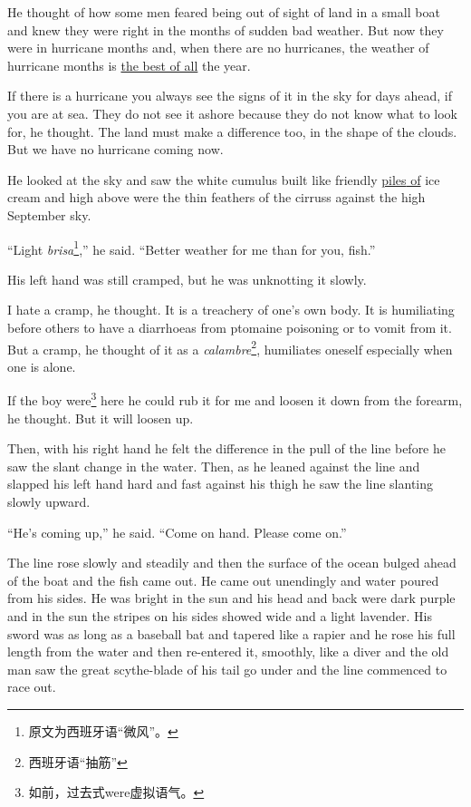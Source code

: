 \documentclass[fontset=ubuntu]{ctexrep}
\begin{document}
He thought of how some men \gls{feared} being out of sight of land in a
small boat and knew they were right in the months of sudden bad weather. But
now they were in \gls{hurricane} months and, when there are no hurricanes, the
weather of hurricane months is \uline{the best of all} the year.

If there is a hurricane you always see the signs of it in the sky for days
ahead, if you are at sea. They do not see it \gls{ashore} because they do not know
what to look for, he thought. The land must make a difference too, in the
shape of the clouds. But we have no hurricane coming now.

He looked at the sky and saw the white \gls{cumulus} built like friendly
\uline{\glspl{pile} of} ice cream and high above were the thin \glspl{feather} of
the \glspl{cirrus} against the high September sky.

``Light \emph{brisa}\footnote{原文为西班牙语“微风”。},'' he said. ``Better
weather for me than for you, fish.''

His left hand was still cramped, but he was \gls{unknotting} it slowly.

I hate a cramp, he thought. It is a treachery of one's own body. It is
\gls{humiliating} before others to have a \glspl{diarrhoea} from
\gls{ptomaine} poisoning or to \gls{vomit} from it. But a cramp, he
thought of it as a \emph{calambre}\footnote{西班牙语“抽筋”}, humiliates oneself
especially when one is alone.

If the boy were\footnote{如前，过去式were虚拟语气。} here he could \gls{rub}
it for me and \gls{loosen} it down from the \gls{forearm}, he thought. But
it will loosen up.

Then, with his right hand he felt the difference in the pull of the line
before he saw the slant change in the water. Then, as he leaned against the
line and slapped his left hand hard and fast against his \gls{thigh} he saw the
line slanting slowly upward.

``He's coming up,'' he said. ``Come on hand. Please come on.''

The line rose slowly and steadily and then the surface of the ocean
\gls{bulged} ahead of the boat and the fish came out. He came out
\gls{unendingly} and water \gls{poured} from his sides. He was bright in the
sun and his head and back were dark purple and in the sun the stripes on his
sides showed wide and a light lavender. His sword was as long as a baseball
\gls{bat} and \gls{tapered} like a rapier and he rose his full length from
the water and then re-entered it, \gls{smoothly}, like a diver and the old
man saw the great scythe-blade of his tail go under and the line commenced
to race out.
\end{document}
